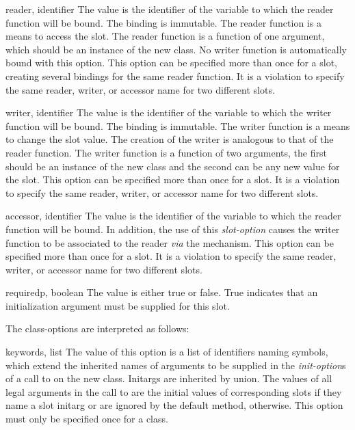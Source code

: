 \begin{optDefinition}
\begin{options}
    \item[reader, identifier]%
    The value is the identifier of the variable to which the reader function
    will be bound.  The binding is immutable.  The reader function is a means to
    access the slot.  The reader function is a function of one argument, which
    should be an instance of the new class.  No writer function is automatically
    bound with this option.  This option can be specified more than once for a
    slot, creating several bindings for the same reader function. It is a
    violation to specify the same reader, writer, or accessor name for two
    different slots.

    \item[writer, identifier]%
    The value is the identifier of the variable to which the writer function
    will be bound.  The binding is immutable.  The writer function is a means to
    change the slot value.  The creation of the writer is analogous to that of
    the reader function. The writer function is a function of two arguments, the
    first should be an instance of the new class and the second can be any new
    value for the slot.  This option can be specified more than once for a slot.
    It is a violation to specify the same reader, writer, or accessor name
    for two different slots.

    \item[accessor, identifier]%
    The value is the identifier of the variable to which the reader function
    will be bound. In addition, the use of this {\em slot-option\/} causes the
    writer function to be associated to the reader {\em via\/} the
     mechanism. This option can be specified more than once
    for a slot. It is a violation to specify the same reader, writer, or
    accessor name for two different slots.

    \item[requiredp, boolean]%
    The value is either true or false. True indicates that an initialization
    argument must be supplied for this slot.
\end{options}
%
The class-options are interpreted as follows:
%
\begin{options}
    \item[keywords, list]%
    The value of this option is a list of identifiers naming symbols, which
    extend the inherited names of arguments to be supplied in the {\em
        init-option\/}s of a call to  on the new
    class. Initargs are inherited by union. The values of all legal arguments in
    the call to  are the initial values of corresponding slots
    if they name a slot initarg or are ignored by the default
     method, otherwise. This option must only be
    specified once for a class.


\end{options}
\end{optDefinition}
